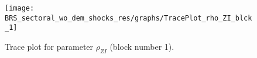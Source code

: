 \begin{figure}[H]
\centering
  \texttt{[image: BRS\_sectoral\_wo\_dem\_shocks\_res/graphs/TracePlot\_rho\_ZI\_blck\_1]}\\
    \caption{Trace plot for parameter ${\rho_{ZI}}$ (block number 1).}
\end{figure}

